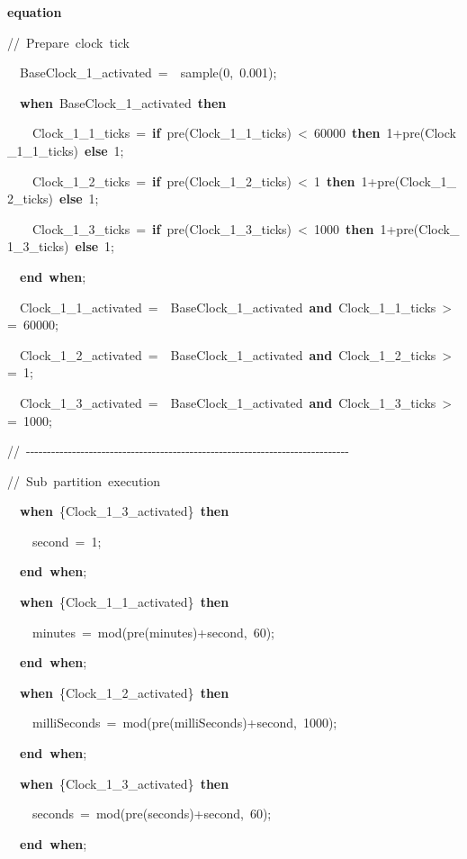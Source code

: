 \documentclass[10pt,a4paper]{report}
\begin{document}
\textbf{equation~}

//~Prepare~clock~tick

~~BaseClock\_1\_activated~=~~sample(0,~0.001);

~~\textbf{when}~BaseClock\_1\_activated~\textbf{then}

~~~~Clock\_1\_1\_ticks~=~\textbf{if}~pre(Clock\_1\_1\_ticks)~\textless{}~60000~\textbf{then}~1+pre(Clock\_1\_1\_ticks)~\textbf{else}~1;

~~~~Clock\_1\_2\_ticks~=~\textbf{if}~pre(Clock\_1\_2\_ticks)~\textless{}~1~\textbf{then}~1+pre(Clock\_1\_2\_ticks)~\textbf{else}~1;

~~~~Clock\_1\_3\_ticks~=~\textbf{if}~pre(Clock\_1\_3\_ticks)~\textless{}~1000~\textbf{then}~1+pre(Clock\_1\_3\_ticks)~\textbf{else}~1;

~~\textbf{end}~\textbf{when};

~~Clock\_1\_1\_activated~=~~BaseClock\_1\_activated~\textbf{and}~Clock\_1\_1\_ticks~\textgreater{}=~60000;

~~Clock\_1\_2\_activated~=~~BaseClock\_1\_activated~\textbf{and}~Clock\_1\_2\_ticks~\textgreater{}=~1;

~~Clock\_1\_3\_activated~=~~BaseClock\_1\_activated~\textbf{and}~Clock\_1\_3\_ticks~\textgreater{}=~1000;

//~-\/-\/-\/-\/-\/-\/-\/-\/-\/-\/-\/-\/-\/-\/-\/-\/-\/-\/-\/-\/-\/-\/-\/-\/-\/-\/-\/-\/-\/-\/-\/-\/-\/-\/-\/-\/-\/-\/-\/-\/-\/-\/-\/-\/-\/-\/-\/-\/-\/-\/-\/-\/-\/-\/-\/-\/-\/-\/-\/-\/-\/-\/-\/-\/-\/-\/-\/-\/-\/-\/-\/-\/-\/-\/-\/-\/-

//~Sub~partition~execution

~~\textbf{when}~\{Clock\_1\_3\_activated\}~\textbf{then}

~~~~second~=~1;

~~\textbf{end~when};

~~\textbf{when}~\{Clock\_1\_1\_activated\}~\textbf{then}

~~~~minutes~=~mod(pre(minutes)+second,~60);

~~\textbf{end~when};

~~\textbf{when}~\{Clock\_1\_2\_activated\}~\textbf{then}

~~~~milliSeconds~=~mod(pre(milliSeconds)+second,~1000);

~~\textbf{end~when};

~~\textbf{when}~\{Clock\_1\_3\_activated\}~\textbf{then}

~~~~seconds~=~mod(pre(seconds)+second,~60);

~~\textbf{end~when};
\end{document}
